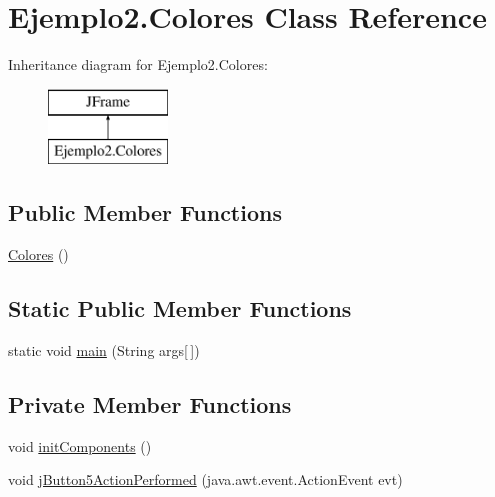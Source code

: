 \hypertarget{class_ejemplo2_1_1_colores}{}\section{Ejemplo2.\+Colores Class Reference}
\label{class_ejemplo2_1_1_colores}
Inheritance diagram for Ejemplo2.\+Colores\+:\begin{figure}[H]
\begin{center}
\leavevmode
\includegraphics[height=2.000000cm]{class_ejemplo2_1_1_colores}
\end{center}
\end{figure}
\subsection*{Public Member Functions}
\begin{DoxyCompactItemize}
\item 
\mbox{\hyperlink{class_ejemplo2_1_1_colores_a37a221b0ca2fb16d86981345c9a8f2d4}{Colores}} ()
\end{DoxyCompactItemize}
\subsection*{Static Public Member Functions}
\begin{DoxyCompactItemize}
\item 
static void \mbox{\hyperlink{class_ejemplo2_1_1_colores_af7d88f830e3d1ade0f6086235fbde21a}{main}} (String args\mbox{[}$\,$\mbox{]})
\end{DoxyCompactItemize}
\subsection*{Private Member Functions}
\begin{DoxyCompactItemize}
\item 
void \mbox{\hyperlink{class_ejemplo2_1_1_colores_a522a4ab17c1c5ec8f6cc59e5eee9ca0d}{init\+Components}} ()
\item 
void \mbox{\hyperlink{class_ejemplo2_1_1_colores_ab9e355df5d63821c45cb7fc08541deb3}{j\+Button5\+Action\+Performed}} (java.\+awt.\+event.\+Action\+Event evt)
\end{DoxyCompactItemize}
